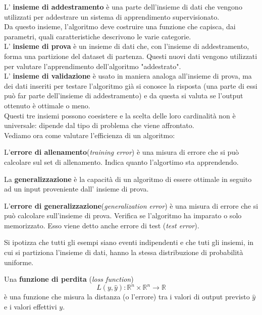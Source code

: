 \documentclass[a4paper,12pt,oneside]{book}
\begin{document}
L' \textbf{insieme di addestramento} \`e una parte dell'insieme di dati che vengono utilizzati per addestrare un sistema di apprendimento supervisionato.\\
Da questo insieme, l'algoritmo deve costruire una funzione che capisca, dai parametri, quali caratteristiche descrivono le varie categorie.\\
L' \textbf{insieme di prova} \`e un insieme di dati che, con l'insieme di addestramento, forma una partizione del dataset di partenza. Questi nuovi dati vengono utilizzati per valutare l'apprendimento dell'algoritmo "addestrato".\\
L' \textbf{insieme di validazione} \`e usato in maniera analoga all'insieme di prova, ma dei dati inseriti per testare l'algoritmo gi\`{a} si conosce la risposta (una parte di essi pu\`{o} far parte dell'insieme di addestramento) e da questa si valuta se l'output ottenuto \`e ottimale o meno.\\
Questi tre insiemi possono coesistere e la scelta delle loro cardinalit\`{a} non \`e universale: dipende dal tipo di problema che viene affrontato.\\
Vediamo ora come valutare l'efficienza di un algoritmo:
\begin{defin}
L'\textbf{errore di allenamento}(\textit{training error}) \`e una misura di errore che si pu\`{o} calcolare sul set di allenamento. Indica quanto l'algortimo sta apprendendo.
\end{defin}
\begin{defin}
La \textbf{generalizzazione} \`e la capacit\`{a} di un algoritmo di essere ottimale in seguito ad un input proveniente dall' insieme di prova.
\end{defin}
\begin{defin}
L'\textbf{errore di generalizzazione}(\textit{generalization error}) \`e una misura di errore che si pu\`{o} calcolare sull'insieme di prova. Verifica se l'algoritmo ha imparato o solo memorizzato.
Esso viene detto anche errore di test (\textit{test error}).
\end{defin}
Si ipotizza che tutti gli esempi siano eventi indipendenti e che tuti gli insiemi, in cui si partiziona l'insieme di dati, hanno la stessa distribuzione di probabilit\`{a} uniforme.
\begin{defin}
Una \textbf{funzione di perdita} (\textit{loss function}) $$L(y,\hat{y}):\mathbb{R}^{n} \times \mathbb{R}^{n} \rightarrow \mathbb{R}$$ \`e una funzione che misura la distanza (o l'errore) tra i valori di output previsto $\hat{y}$ e i valori effettivi ${y}$.
\end{defin}
\end{document}
